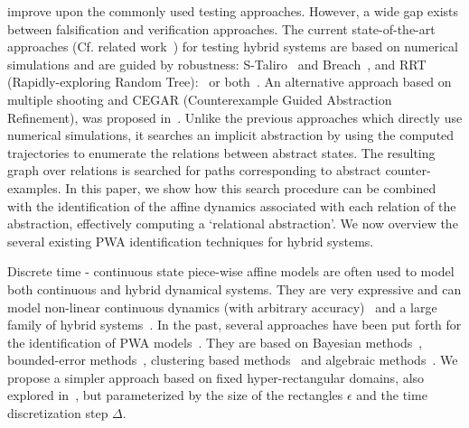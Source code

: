 
improve upon the commonly used testing approaches. However, a wide gap
exists between falsification and verification approaches. The current
state-of-the-art approaches (Cf. related work~\cite{nghiem2010monte})
for testing hybrid systems are based on numerical simulations and are
guided by robustness: S-Taliro~\cite{annpureddy2011s} and
Breach~\cite{donze2010breach}, and RRT (Rapidly-exploring Random
Tree):~\cite{nahhal_test_2007,Dang09} or
both~\cite{dreossi2015efficient}. An alternative approach based on
multiple shooting and CEGAR (Counterexample Guided Abstraction
Refinement), was proposed in~\cite{zutshi2014multiple}. Unlike the
previous approaches which directly use numerical simulations, it
searches an implicit abstraction by using the computed trajectories to
enumerate the relations between abstract states. The resulting graph
over relations is searched for paths corresponding to abstract
counter-examples. In this paper, we show how this search procedure can
be combined with the identification of the affine dynamics associated
with each relation of the abstraction, effectively computing a
`relational abstraction'. We now overview the several existing PWA
identification techniques for hybrid systems.


 Discrete time - continuous
state piece-wise affine models are often used to model both continuous
and hybrid dynamical systems. They are very expressive and can model
non-linear continuous dynamics (with arbitrary
accuracy)~\cite{wen2008basis} and a large family of hybrid
systems~\cite{heemels2001equivalence}. In the past, several approaches
have been put forth for the identification of PWA
models~\cite{paoletti2007identification}.  They are based on Bayesian
methods~\cite{juloski2005bayesian}, bounded-error
methods~\cite{bemporad2003greedy, bemporad2005bounded,
roll2004identification, alur2014precise}, clustering based
methods~\cite{ferrari2003clustering} and algebraic
methods~\cite{vidal2003algebraic}. We propose a simpler approach based
on fixed hyper-rectangular domains, also explored
in~\cite{billings1987piecewise}, but parameterized by the size of the
rectangles $\epsilon$ and the time discretization step $\Delta$.

